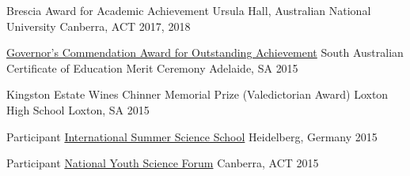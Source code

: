 \begin{cvhonors}
  \cvhonor
    {Brescia Award for Academic Achievement} %
    {Ursula Hall, Australian National University} %
    {Canberra, ACT} %
    {2017, 2018} %

  \cvhonor
    {\href{https://www.sace.sa.edu.au/governor-commendations/excellence-award}{Governor’s Commendation Award for Outstanding Achievement}} %
    {South Australian Certificate of Education Merit Ceremony} %
    {Adelaide, SA} %
    {2015} %
    
  \cvhonor
    {Kingston Estate Wines Chinner Memorial Prize (Valedictorian Award)} %
    {Loxton High School} %
    {Loxton, SA} %
    {2015} %




\end{cvhonors}




\begin{cvhonors}




  \cvhonor
    {Participant} %
    {\href{https://www.ish-heidelberg.de}{International Summer Science School}} %
    {Heidelberg, Germany} %
    {2015} %

  \cvhonor
    {Participant} %
    {\href{https://www.nysf.edu.au/}{National Youth Science Forum}} %
    {Canberra, ACT} %
    {2015} %

\end{cvhonors}
